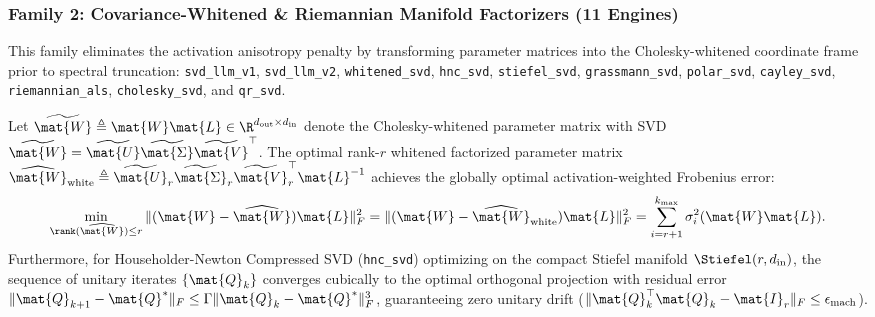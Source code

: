 \subsubsection{Family 2: Covariance-Whitened \& Riemannian Manifold Factorizers (11 Engines)}
This family eliminates the activation anisotropy penalty by transforming parameter matrices into the Cholesky-whitened coordinate frame prior to spectral truncation: \texttt{svd\_llm\_v1}, \texttt{svd\_llm\_v2}, \texttt{whitened\_svd}, \texttt{hnc\_svd}, \texttt{stiefel\_svd}, \texttt{grassmann\_svd}, \texttt{polar\_svd}, \texttt{cayley\_svd}, \texttt{riemannian\_als}, \texttt{cholesky\_svd}, and \texttt{qr\_svd}.
\begin{theorem}
\label{thm:frob_whitened_svd}
Let $\widetilde{\mat{W}} \triangleq \mat{W} \mat{L} \in \R^{d_{\text{out}} \times d_{\text{in}}}$ denote the Cholesky-whitened parameter matrix with SVD $\widetilde{\mat{W}} = \widetilde{\mat{U}} \widetilde{\mat{\Sigma}} \widetilde{\mat{V}}^\top$. The optimal rank-$r$ whitened factorized parameter matrix $\widehat{\mat{W}}_{\text{white}} \triangleq \widetilde{\mat{U}}_r \widetilde{\mat{\Sigma}}_r \widetilde{\mat{V}}_r^\top \mat{L}^{-1}$ achieves the globally optimal activation-weighted Frobenius error:
\begin{equation}
\min_{\rank(\widehat{\mat{W}}) \le r} \|(\mat{W} - \widehat{\mat{W}})\mat{L}\|_F^2 = \|(\mat{W} - \widehat{\mat{W}}_{\text{white}})\mat{L}\|_F^2 = \sum_{i=r+1}^{k_{\max}} \sigma_i^2(\mat{W} \mat{L}).
\label{eq:frob_bound_whitened_family}
\end{equation}
Furthermore, for Householder-Newton Compressed SVD (\texttt{hnc\_svd}) optimizing on the compact Stiefel manifold $\Stiefel(r, d_{\text{in}})$, the sequence of unitary iterates $\{\mat{Q}_k\}$ converges cubically to the optimal orthogonal projection with residual error $\|\mat{Q}_{k+1} - \mat{Q}^*\|_F \le \Gamma \|\mat{Q}_k - \mat{Q}^*\|_F^3$, guaranteeing zero unitary drift ($\|\mat{Q}_k^\top \mat{Q}_k - \mat{I}_r\|_F \le \epsilon_{\text{mach}}$).
\end{theorem}

